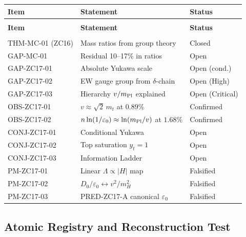 \documentclass[12pt, a4paper]{article}
\begin{document}
\begin{derivedbox}[title={Z-Programme Status after TASK-ZC17}]
{\small
\setlength{\LTpre}{4pt}
\setlength{\LTpost}{4pt}
\renewcommand{\arraystretch}{1.30}
\begin{longtable}{>{\raggedright\arraybackslash}p{3.8cm}
                  >{\raggedright\arraybackslash}p{6.5cm}
                  >{\raggedright\arraybackslash}p{2.0cm}}
\toprule
\textbf{Item} & \textbf{Statement} & \textbf{Status} \\
\midrule
\endfirsthead
\multicolumn{3}{l}{\small\textit{(continued)}}\\[4pt]
\toprule
\textbf{Item} & \textbf{Statement} & \textbf{Status} \\
\midrule
\endhead
\midrule
\multicolumn{3}{r}{\small\textit{(continues)}}\\
\endfoot
\bottomrule
\endlastfoot
THM-MC-01 (ZC16) & Mass ratios from group theory & Closed \\
GAP-MC-01       & Residual 10--17\% in ratios & Open \\
\midrule
GAP-ZC17-01     & Absolute Yukawa scale & Open (cond.) \\
GAP-ZC17-02     & EW gauge group from $\delta$-chain & Open (High) \\
GAP-ZC17-03     & Hierarchy $v/m_{\rm Pl}$ explained & Open (Critical) \\
\midrule
OBS-ZC17-01     & $v\approx\sqrt{2}\,m_t$ at $0.89\%$ & Confirmed \\
OBS-ZC17-02     & $n\ln(1/\varepsilon_0)\approx\ln(m_{\rm Pl}/v)$ at $1.68\%$ & Confirmed \\
CONJ-ZC17-01    & Conditional Yukawa & Open \\
CONJ-ZC17-02    & Top saturation $y_t=1$ & Open \\
CONJ-ZC17-03    & Information Ladder & Open \\
\midrule
PM-ZC17-01      & Linear $\Lambda\propto|H|$ map & Falsified \\
PM-ZC17-02      & $D_0/\varepsilon_0 \leftrightarrow v^2/m_H^2$ & Falsified \\
PM-ZC17-03      & PRED-ZC17-A canonical $\varepsilon_0$ & Falsified \\
\end{longtable}
}
\vspace{-6pt}
\end{derivedbox}

\subsection{Atomic Registry and Reconstruction Test}
\label{zc17:sec:registry}
\end{document}
